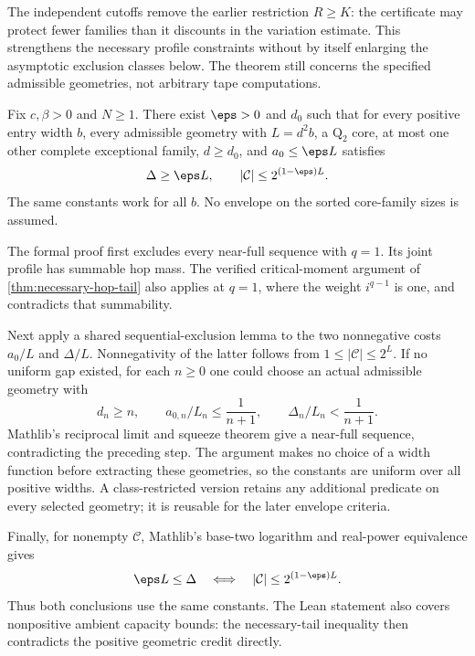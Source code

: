 The independent cutoffs remove the earlier restriction $R\ge K$:
the certificate may protect fewer families than it discounts in the
variation estimate. This strengthens
the necessary profile constraints without by itself enlarging the
asymptotic exclusion classes below. The theorem still concerns the
specified admissible geometries, not arbitrary tape computations.

\begin{corollary}\label{cor:one-exception}
Fix $c,\beta>0$ and $N\ge1$. There exist $\eps>0$ and $d_0$ such that
for every positive entry width $b$, every admissible geometry with
$L=d^2b$, a $\mathrm Q_2$ core, at most one other
complete exceptional family, $d\ge d_0$, and $a_0\le\eps L$ satisfies
\begin{equation}\label{eq:uniform-deficit}
 \Delta\ge\eps L,\qquad
 |\mathcal C|\le2^{(1-\eps)L}.
\end{equation}
The same constants work for all $b$. No envelope on the sorted
core-family sizes is assumed.
\end{corollary}
\begin{outline}
The formal proof first excludes every near-full sequence with $q=1$.
Its joint profile has summable hop mass. The verified critical-moment
argument of \cref{thm:necessary-hop-tail} also applies at $q=1$, where
the weight $i^{q-1}$ is one, and contradicts that summability.

Next apply a shared sequential-exclusion lemma to the two nonnegative
costs $a_0/L$ and $\Delta/L$. Nonnegativity of the latter follows from
$1\le|\mathcal C|\le2^L$. If no uniform gap existed, for each
$n\ge0$ one could choose an actual admissible geometry with
\[
 d_n\ge n,\qquad
 a_{0,n}/L_n\le\frac1{n+1},\qquad
 \Delta_n/L_n<\frac1{n+1}.
\]
Mathlib's reciprocal limit and squeeze theorem give a near-full
sequence, contradicting the preceding step. The argument makes no
choice of a width function before extracting these geometries, so the
constants are uniform over all positive widths. A class-restricted
version retains any additional predicate on every selected geometry;
it is reusable for the later envelope criteria.

Finally, for nonempty $\mathcal C$, Mathlib's base-two logarithm and
real-power equivalence gives
\[
 \eps L\le\Delta
 \quad\Longleftrightarrow\quad
 |\mathcal C|\le2^{(1-\eps)L}.
\]
Thus both conclusions use the same constants. The Lean statement also
covers nonpositive ambient capacity bounds: the necessary-tail
inequality then contradicts the positive geometric credit directly.
\end{outline}

